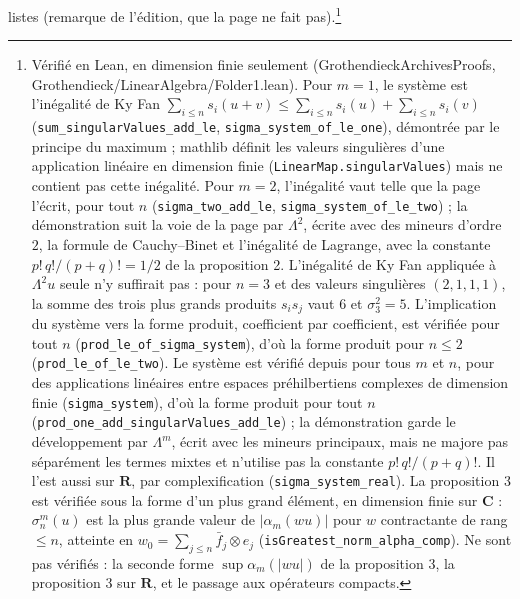 \documentclass[11pt,a4paper]{article}
\begin{document}
listes (remarque de l'édition, que la page ne fait pas).\footnote{Vérifié en Lean, en dimension finie seulement
(GrothendieckArchivesProofs, Grothendieck/LinearAlgebra/Folder1.lean). Pour $m = 1$, le système est l'inégalité de
Ky Fan $\sum_{i \leq n} s_i(u+v) \leq \sum_{i \leq n} s_i(u) + \sum_{i \leq n}
s_i(v)$ (\texttt{sum\_singularValues\_add\_le}, \texttt{sigma\_system\_of\_le\_one}),
démontrée par le principe du maximum ; mathlib définit les valeurs
singulières d'une application linéaire en dimension finie
(\texttt{LinearMap.singularValues}) mais ne contient pas cette inégalité.
Pour $m = 2$, l'inégalité vaut telle que la page l'écrit, pour tout $n$
(\texttt{sigma\_two\_add\_le}, \texttt{sigma\_system\_of\_le\_two}) ; la
démonstration suit la voie de la page par $\Lambda^2$, écrite avec des
mineurs d'ordre $2$, la formule de Cauchy--Binet et l'inégalité de Lagrange,
avec la constante $p!\,q!/(p+q)! = 1/2$ de la proposition 2. L'inégalité de
Ky Fan appliquée à $\Lambda^2 u$ seule n'y suffirait pas : pour $n = 3$ et des
valeurs singulières $(2, 1, 1, 1)$, la somme des trois plus grands produits
$s_is_j$ vaut $6$ et $\sigma_3^2 = 5$. L'implication du système vers la forme
produit, coefficient par coefficient, est vérifiée pour tout $n$
(\texttt{prod\_le\_of\_sigma\_system}), d'où la forme produit pour $n \leq 2$
(\texttt{prod\_le\_of\_le\_two}). Le système est vérifié depuis pour tous $m$
et $n$, pour des applications linéaires entre espaces préhilbertiens complexes
de dimension finie (\texttt{sigma\_system}), d'où la forme produit pour tout $n$
(\texttt{prod\_one\_add\_singularValues\_add\_le}) ; la démonstration garde le
développement par $\Lambda^m$, écrit avec les mineurs principaux, mais ne
majore pas séparément les termes mixtes et n'utilise pas la constante
$p!\,q!/(p+q)!$. Il l'est aussi sur $\mathbf{R}$, par complexification
(\texttt{sigma\_system\_real}). La proposition 3 est vérifiée sous la forme
d'un plus grand élément, en dimension finie sur $\mathbf{C}$ : $\sigma_n^m(u)$
est la plus grande valeur de $|\alpha_m(wu)|$ pour $w$ contractante de rang
$\leq n$, atteinte en $w_0 = \sum_{j \leq n} \bar{f}_j \otimes e_j$
(\texttt{isGreatest\_norm\_alpha\_comp}). Ne sont pas vérifiés : la seconde
forme $\sup \alpha_m(|wu|)$ de la proposition 3, la proposition 3 sur
$\mathbf{R}$, et le passage aux opérateurs compacts.}
\end{document}
